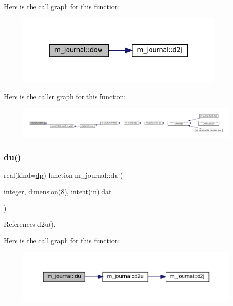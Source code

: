 Here is the call graph for this function\+:\nopagebreak
\begin{figure}[H]
\begin{center}
\leavevmode
\includegraphics[width=294pt]{namespacem__journal_a40b5e01c631024472f21521c9705881a_cgraph}
\end{center}
\end{figure}
Here is the caller graph for this function\+:\nopagebreak
\begin{figure}[H]
\begin{center}
\leavevmode
\includegraphics[width=350pt]{namespacem__journal_a40b5e01c631024472f21521c9705881a_icgraph}
\end{center}
\end{figure}
\mbox{\label{namespacem__journal_a1736ec58cd905293782a2663df69bc89}} 
\subsubsection{\texorpdfstring{du()}{du()}}
{\footnotesize\ttfamily real(kind=\mbox{\hyperlink{namespacem__journal_aaae0522a70bb76a85ea800670d5fec5f}{dp}}) function m\+\_\+journal\+::du (\begin{DoxyParamCaption}\item[{integer, dimension(8), intent(in)}]{dat }\end{DoxyParamCaption})\hspace{0.3cm}{\ttfamily [private]}}



References d2u().

Here is the call graph for this function\+:\nopagebreak
\begin{figure}[H]
\begin{center}
\leavevmode
\includegraphics[width=350pt]{namespacem__journal_a1736ec58cd905293782a2663df69bc89_cgraph}
\end{center}
\end{figure}
\mbox{\label{namespacem__journal_a24b891eded8ca585a6a72ab0eef7016c}} 
